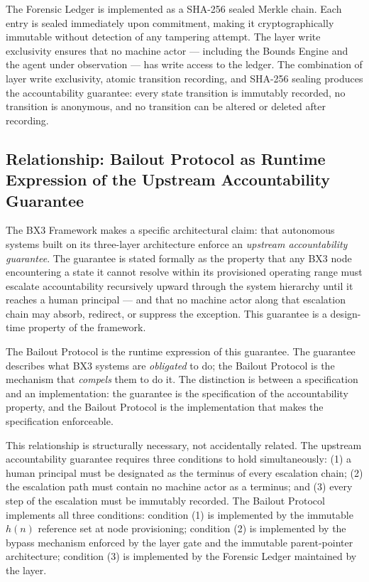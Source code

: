 The Forensic Ledger is implemented as a SHA-256 sealed Merkle chain. Each entry is sealed immediately upon commitment, making it cryptographically immutable without detection of any tampering attempt. The \fact{} layer write exclusivity ensures that no machine actor --- including the Bounds Engine and the agent under observation --- has write access to the ledger. The combination of \fact{} layer write exclusivity, atomic transition recording, and SHA-256 sealing produces the accountability guarantee: every state transition is immutably recorded, no transition is anonymous, and no transition can be altered or deleted after recording.

\subsection{Relationship: Bailout Protocol as Runtime Expression of the Upstream Accountability Guarantee}
\label{sec:bailout-as-runtime-expression}

The BX3 Framework makes a specific architectural claim: that autonomous systems built on its three-layer architecture enforce an \emph{upstream accountability guarantee}. The guarantee is stated formally as the property that any BX3 node encountering a state it cannot resolve within its provisioned operating range must escalate accountability recursively upward through the system hierarchy until it reaches a human principal --- and that no machine actor along that escalation chain may absorb, redirect, or suppress the exception. This guarantee is a design-time property of the framework.

The Bailout Protocol is the runtime expression of this guarantee. The guarantee describes what BX3 systems are \emph{obligated} to do; the Bailout Protocol is the mechanism that \emph{compels} them to do it. The distinction is between a specification and an implementation: the guarantee is the specification of the accountability property, and the Bailout Protocol is the implementation that makes the specification enforceable.

This relationship is structurally necessary, not accidentally related. The upstream accountability guarantee requires three conditions to hold simultaneously: (1) a human principal must be designated as the terminus of every escalation chain; (2) the escalation path must contain no machine actor as a terminus; and (3) every step of the escalation must be immutably recorded. The Bailout Protocol implements all three conditions: condition (1) is implemented by the immutable $h(n)$ reference set at node provisioning; condition (2) is implemented by the bypass mechanism enforced by the \fact{} layer gate and the immutable parent-pointer architecture; condition (3) is implemented by the Forensic Ledger maintained by the \fact{} layer.


